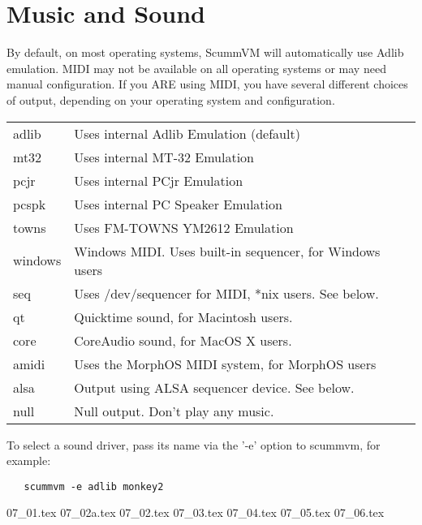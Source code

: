 

\section{Music and Sound} \label{sect-music-and-sound}
By default, on most operating systems, ScummVM will automatically use Adlib
emulation. MIDI may not be available on all operating systems or may need
manual configuration. If you ARE using MIDI, you have several different
choices of output, depending on your operating system and configuration.

\begin{tabular}[h]{ll}
  adlib     & Uses internal Adlib Emulation (default)\\
  mt32      & Uses internal MT-32 Emulation\\
  pcjr      & Uses internal PCjr Emulation \\
  pcspk     & Uses internal PC Speaker Emulation\\
  towns     & Uses FM-TOWNS YM2612 Emulation\\
  windows   & Windows MIDI. Uses built-in sequencer, for Windows users\\
  seq       & Uses /dev/sequencer for MIDI, *nix users. See below.\\
  qt        & Quicktime sound, for Macintosh users.\\
  core      & CoreAudio sound, for MacOS X users.\\
  amidi     & Uses the MorphOS MIDI system, for MorphOS users\\
  alsa      & Output using ALSA sequencer device. See below.\\
  null      & Null output. Don't play any music.\\
\end{tabular}

To select a sound driver, pass its name via the '-e' option to scummvm,
for example:
\begin{verbatim}
   scummvm -e adlib monkey2
\end{verbatim}

 {07_01.tex}
 {07_02a.tex}
 {07_02.tex}
 {07_03.tex}
 {07_04.tex}
 {07_05.tex}
 {07_06.tex}
